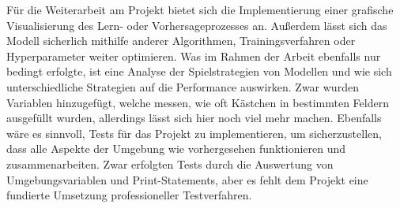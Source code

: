 Für die Weiterarbeit am Projekt bietet sich die Implementierung einer grafische Visualisierung des Lern- oder Vorhersageprozesses an. Außerdem lässt sich das Modell sicherlich mithilfe anderer Algorithmen, Trainingsverfahren oder Hyperparameter weiter optimieren. Was im Rahmen der Arbeit ebenfalls nur bedingt erfolgte, ist eine Analyse der Spielstrategien von Modellen und wie sich unterschiedliche Strategien auf die Performance auswirken. Zwar wurden Variablen hinzugefügt, welche messen, wie oft Kästchen in bestimmten Feldern ausgefüllt wurden, allerdings lässt sich hier noch viel mehr machen. Ebenfalls wäre es sinnvoll, Tests für das Projekt zu implementieren, um sicherzustellen, dass alle Aspekte der Umgebung wie vorhergesehen funktionieren und zusammenarbeiten. Zwar erfolgten Tests durch die Auswertung von Umgebungsvariablen und Print-Statements, aber es fehlt dem Projekt eine fundierte Umsetzung professioneller Testverfahren.